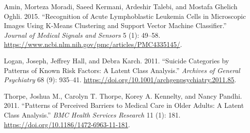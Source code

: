 \documentclass[
]{article}
\newlength{\cslhangindent}
\newlength{\cslentryspacingunit} %
\newenvironment{CSLReferences}[2] %
 {%
  \setlength{\parindent}{0pt}
  \ifodd #1
  \let\oldpar\par
  \def\par{\hangindent=\cslhangindent\oldpar}
  \fi
  \setlength{\parskip}{#2\cslentryspacingunit}
 }%
 {}
\begin{document}
\hypertarget{refs}{}
\begin{CSLReferences}{1}{0}
\leavevmode{}%
Amin, Morteza Moradi, Saeed Kermani, Ardeshir Talebi, and Mostafa
Ghelich Oghli. 2015. {``Recognition of {Acute} {Lymphoblastic}
{Leukemia} {Cells} in {Microscopic} {Images} {Using} {K}-{Means}
{Clustering} and {Support} {Vector} {Machine} {Classifier}.''}
\emph{Journal of Medical Signals and Sensors} 5 (1): 49--58.
\url{https://www.ncbi.nlm.nih.gov/pmc/articles/PMC4335145/}.

\leavevmode{}%
Logan, Joseph, Jeffrey Hall, and Debra Karch. 2011. {``Suicide
{Categories} by {Patterns} of {Known} {Risk} {Factors}: {A} {Latent}
{Class} {Analysis}.''} \emph{Archives of General Psychiatry} 68 (9):
935--41. \url{https://doi.org/10.1001/archgenpsychiatry.2011.85}.

\leavevmode{}%
Thorpe, Joshua M., Carolyn T. Thorpe, Korey A. Kennelty, and Nancy
Pandhi. 2011. {``Patterns of Perceived Barriers to Medical Care in Older
Adults: A Latent Class Analysis.''} \emph{BMC Health Services Research}
11 (1): 181. \url{https://doi.org/10.1186/1472-6963-11-181}.

\end{CSLReferences}
\end{document}
